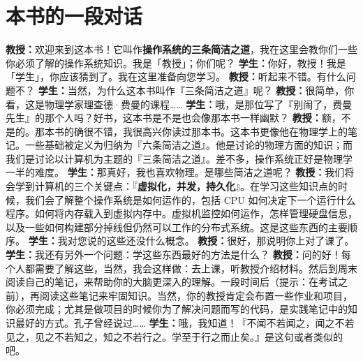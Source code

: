 \chapter{本书的一段对话}
\thispagestyle{empty}


\textbf{教授：}欢迎来到这本书！它叫作\textbf{操作系统的三条简洁之道}，我在这里会教你们一些你必须了解的操作系统知识。我是「教授」；你们呢？\newline
\textbf{学生：}你好，教授！我是「学生」，你应该猜到了。我在这里准备向您学习。\newline
\textbf{教授：}听起来不错。有什么问题不？\newline
\textbf{学生：}当然，为什么这本书叫作『三条简洁之道』呢？\newline
\textbf{教授：}很简单，你看，这是物理学家理查德·费曼的课程……\newline
\textbf{学生：}哦，是那位写了『别闹了，费曼先生』的那个人吗？好书，这本书是不是也会像那本书一样幽默？\newline
\textbf{教授：}额，不是的。那本书的确很不错，我很高兴你读过那本书。这本书更像他在物理学上的笔记。一些基础被定义为归纳为『六条简洁之道』。他是讨论的物理方面的知识；而我们是讨论以计算机为主题的『三条简洁之道』。差不多，操作系统正好是物理学一半的难度。\newline
\textbf{学生：}那真好，我也喜欢物理。是哪些简洁之道呢？\newline
\textbf{教授：}我们将会学到计算机的三个关键点：『\textbf{虚拟化，并发，持久化}』。在学习这些知识点的时候，我们会了解整个操作系统是如何运作的，包括 CPU 如何决定下一个运行什么程序。如何将内存载入到虚拟内存中。虚拟机监控如何运作，怎样管理硬盘信息，以及一些如何构建部分掉线但仍然可以工作的分布式系统。这是这些东西的主要顺序。\newline
\textbf{学生：}我对您说的这些还没什么概念。\newline
\textbf{教授：}很好，那说明你上对了课了。\newline
\textbf{学生：}我还有另外一个问题：学这些东西最好的方法是什么？\newline
\textbf{教授：}问的好！每个人都需要了解这些，当然，我会这样做：去上课，听教授介绍材料。然后到周末阅读自己的笔记，来帮助你的大脑更深入的理解。一段时间后（提示：在考试之前），再阅读这些笔记来牢固知识。当然，你的教授肯定会布置一些作业和项目，你必须完成；尤其是做项目的时候你为了解决问题而写的代码，是实践笔记中的知识最好的方式。孔子曾经说过……\newline
\textbf{学生：}哦，我知道！『不闻不若闻之，闻之不若见之，见之不若知之，知之不若行之。学至于行之而止矣。』是这句或者类似的吧。\newline
